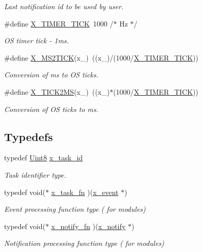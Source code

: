 \begin{DoxyCompactItemize}
\begin{DoxyCompactList}\small\item\em Last notification id to be used by user. \end{DoxyCompactList}\item 
\#define \hyperlink{a00036_ac606e478c91dc9a2ddc0816152b18979}{X\+\_\+\+T\+I\+M\+E\+R\+\_\+\+T\+I\+C\+K}~1000 /$\ast$ Hz $\ast$/
\begin{DoxyCompactList}\small\item\em O\+S timer tick -\/ 1ms. \end{DoxyCompactList}\item 
\#define \hyperlink{a00036_a1732cd929c486b3a225824bb2b3dba36}{X\+\_\+\+M\+S2\+T\+I\+C\+K}(x\+\_\+)~((x\+\_\+)/(1000/\hyperlink{a00036_ac606e478c91dc9a2ddc0816152b18979}{X\+\_\+\+T\+I\+M\+E\+R\+\_\+\+T\+I\+C\+K}))
\begin{DoxyCompactList}\small\item\em Conversion of ms to O\+S ticks. \end{DoxyCompactList}\item 
\#define \hyperlink{a00036_a8c687347943f251bc052fa9a43a2b69b}{X\+\_\+\+T\+I\+C\+K2\+M\+S}(x\+\_\+)~((x\+\_\+)$\ast$(1000/\hyperlink{a00036_ac606e478c91dc9a2ddc0816152b18979}{X\+\_\+\+T\+I\+M\+E\+R\+\_\+\+T\+I\+C\+K}))
\begin{DoxyCompactList}\small\item\em Conversion of O\+S ticks to ms. \end{DoxyCompactList}\end{DoxyCompactItemize}
\subsection*{Typedefs}
\begin{DoxyCompactItemize}
\item 
typedef \hyperlink{a00072_af84840501dec18061d18a68c162a8fa2}{Uint8} \hyperlink{a00036_ad5c3c5fbfd3e4aadf22830395484a71d}{x\+\_\+task\+\_\+id}
\begin{DoxyCompactList}\small\item\em Task identifier type. \end{DoxyCompactList}\item 
typedef void($\ast$ \hyperlink{a00036_ace830f248538d21bb16ea9c00997fcd7}{x\+\_\+task\+\_\+fn} )(\hyperlink{a00036_de/d37/a00849}{x\+\_\+event} $\ast$)
\begin{DoxyCompactList}\small\item\em Event processing function type ( for modules) \end{DoxyCompactList}\item 
typedef void($\ast$ \hyperlink{a00036_a29c1adcba84e0c3e83657c91e9b2b764}{x\+\_\+notify\+\_\+fn} )(\hyperlink{a00036_df/d4c/a00851}{x\+\_\+notify} $\ast$)
\begin{DoxyCompactList}\small\item\em Notification processing function type ( for modules) \end{DoxyCompactList}\end{DoxyCompactItemize}
